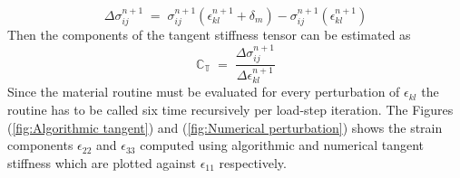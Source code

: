 \documentclass[12pt,a4paper,twoside,openright]{report}
\begin{document}
\begin{equation}
\Delta\sigma_{ij}^{n+1} \; = \; \sigma_{ij}^{n+1}(\epsilon_{kl}^{n+1}+\delta_m) - \sigma_{ij}^{n+1}(\epsilon_{kl}^{n+1})
\end{equation}
Then the components of the tangent stiffness tensor can be estimated as
\begin{equation}
 \mathbb{C_T} \;  =  \;  \frac{\Delta\sigma_{ij}^{n+1}}{\Delta\epsilon_{kl}^{n+1}}
\end{equation}
Since the material routine must be evaluated for every perturbation of $\epsilon_{kl}$ the routine has to be called six time recursively per load-step iteration. The Figures (\ref{fig:Algorithmic tangent})  and (\ref{fig:Numerical perturbation}) shows the strain components $\epsilon_{22}$ and $\epsilon_{33}$ computed using algorithmic and numerical tangent stiffness which are plotted against $\epsilon_{11}$  respectively.\\
\end{document}
